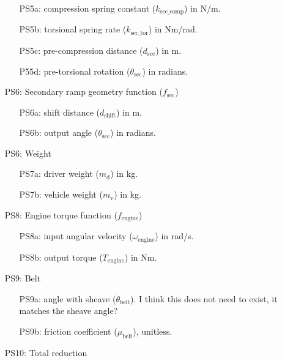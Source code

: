 \documentclass[12pt]{article}
\begin{document}
\begin{itemize}
\begin{itemize}
  \item [PS5a:] compression spring constant ($k_{\text{sec\_comp}}$) in N/m.
  \item [PS5b:] torsional spring rate ($k_{\text{sec\_tor}}$) in Nm/rad.
  \item [PS5c:] pre-compression distance ($d_{\text{sec}}$) in m.
  \item [P55d:] pre-torsional rotation ($\theta_{\text{sec}}$) in radians.
\end{itemize}

\item[PS6:] Secondary ramp geometry function ($f_{\text{sec}}$)

\begin{itemize}
  \item [PS6a:] shift distance ($d_{\text{shift}}$) in m.
  \item [PS6b:] output angle ($\theta_{\text{sec}}$) in radians.
\end{itemize}

\item[PS6:] Weight

\begin{itemize}
  \item [PS7a:] driver weight ($m_{\text{d}}$) in kg.
  \item [PS7b:] vehicle weight ($m_{\text{v}}$) in kg.
\end{itemize}

\item[PS8:] Engine torque function ($f_{\text{engine}}$)

\begin{itemize}
  \item [PS8a:] input angular velocity ($\omega_{\text{engine}}$) in rad/s.
  \item [PS8b:] output torque ($T_{\text{engine}}$) in Nm.
\end{itemize}

\item[PS9:] Belt

\begin{itemize}
  \item [PS9a:] angle with sheave ($\theta_{\text{belt}}$). I think this does not need to exist, it matches the sheave angle?
  \item [PS9b:] friction coefficient ($\mu_{\text{belt}}$), unitless.
\end{itemize}

\item[PS10:] Total reduction


\end{itemize}
\end{document}
